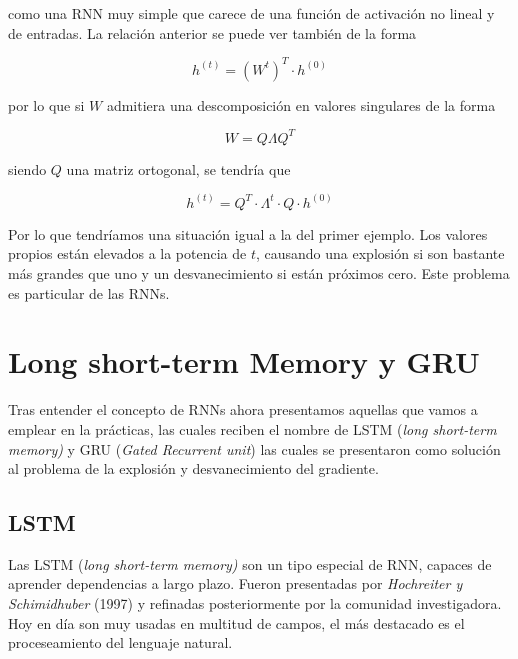         \noindent como una RNN muy simple que carece de una función de activación no lineal y de entradas. La relación anterior se puede ver también de la forma 
        
        \begin{equation}
            h^{(t)} = (W^t)^T \cdot h^{(0)}
        \end{equation}
        
        \noindent por lo que si $W$ admitiera una descomposición en valores singulares de la forma 
        
        \begin{equation}
            W = Q \Lambda Q^T
        \end{equation}
        
        \noindent siendo $Q$ una matriz ortogonal, se tendría que 
        
        \begin{equation}
            h^{(t)} = Q^T \cdot \Lambda^t \cdot Q \cdot h^{(0)}
        \end{equation}
        
        \noindent Por lo que tendríamos una situación igual a la del primer ejemplo. Los valores propios están elevados a la potencia de $t$, causando una explosión si son bastante más grandes que uno y un desvanecimiento si están próximos cero. Este problema es particular de las RNNs. 


\section{Long short-term Memory y GRU}

    Tras entender el concepto de RNNs ahora presentamos aquellas que vamos a emplear en la prácticas, las cuales reciben el nombre de LSTM (\textit{long short-term memory)} y GRU (\textit{Gated Recurrent unit}) las cuales se presentaron como solución al problema de la explosión y desvanecimiento del gradiente. \\

    \subsection{LSTM}

    Las LSTM (\textit{long short-term memory)} son un tipo especial de RNN, capaces de aprender dependencias a largo plazo. Fueron presentadas por \textit{Hochreiter y Schimidhuber} (1997) \cite{hochreiter1997long} y refinadas posteriormente por la comunidad investigadora. Hoy en día son muy usadas en multitud de campos, el más destacado es el proceseamiento del lenguaje natural. \\
    
